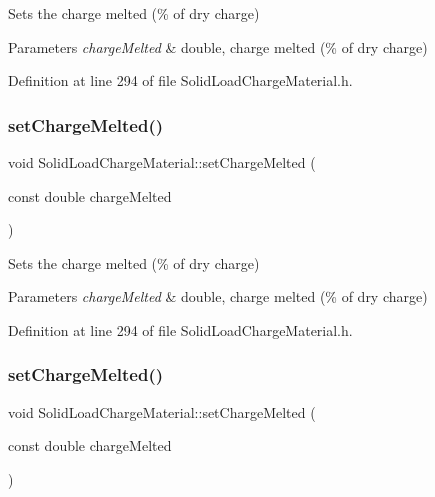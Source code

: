 Sets the charge melted (\% of dry charge) 
\begin{DoxyParams}{Parameters}
{\em charge\+Melted} & double, charge melted (\% of dry charge) \\
\hline
\end{DoxyParams}


Definition at line 294 of file Solid\+Load\+Charge\+Material.\+h.

\mbox{\label{class_solid_load_charge_material_a9999a2976e8a8662a86cc2a159df5202}} 
\subsubsection{\texorpdfstring{set\+Charge\+Melted()}{setChargeMelted()}\hspace{0.1cm}{\footnotesize\ttfamily [2/3]}}
{\footnotesize\ttfamily void Solid\+Load\+Charge\+Material\+::set\+Charge\+Melted (\begin{DoxyParamCaption}\item[{const double}]{charge\+Melted }\end{DoxyParamCaption})\hspace{0.3cm}{\ttfamily [inline]}}

Sets the charge melted (\% of dry charge) 
\begin{DoxyParams}{Parameters}
{\em charge\+Melted} & double, charge melted (\% of dry charge) \\
\hline
\end{DoxyParams}


Definition at line 294 of file Solid\+Load\+Charge\+Material.\+h.

\mbox{\label{class_solid_load_charge_material_a9999a2976e8a8662a86cc2a159df5202}} 
\subsubsection{\texorpdfstring{set\+Charge\+Melted()}{setChargeMelted()}\hspace{0.1cm}{\footnotesize\ttfamily [3/3]}}
{\footnotesize\ttfamily void Solid\+Load\+Charge\+Material\+::set\+Charge\+Melted (\begin{DoxyParamCaption}\item[{const double}]{charge\+Melted }\end{DoxyParamCaption})\hspace{0.3cm}{\ttfamily [inline]}}

